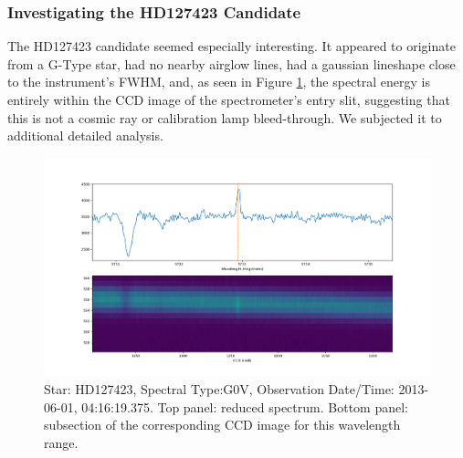 \documentclass[linenumbers]{aastex631}
\begin{document}

\subsubsection{Investigating the HD127423 Candidate} 
\label{s:hd127423}

The HD127423 candidate seemed especially interesting.  It appeared to originate from a G-Type star, had no nearby airglow lines, had a gaussian lineshape close to the instrument's FWHM, and, as seen in Figure \ref{fig:seti_candidate_HD127423}, the spectral energy is entirely within the CCD image of the spectrometer's entry slit, suggesting that this is not a cosmic ray or calibration lamp bleed-through.  We subjected it to additional detailed analysis.

\begin{figure}
    \centering  \includegraphics[width=\textwidth]{HD127423.png}
    \caption{Star: HD127423, Spectral Type:G0V, Observation Date/Time: 2013-06-01, 04:16:19.375. Top panel: reduced spectrum.  Bottom panel: subsection of the corresponding CCD image for this wavelength range.}
    \label{fig:seti_candidate_HD127423}
\end{figure}
\end{document}
